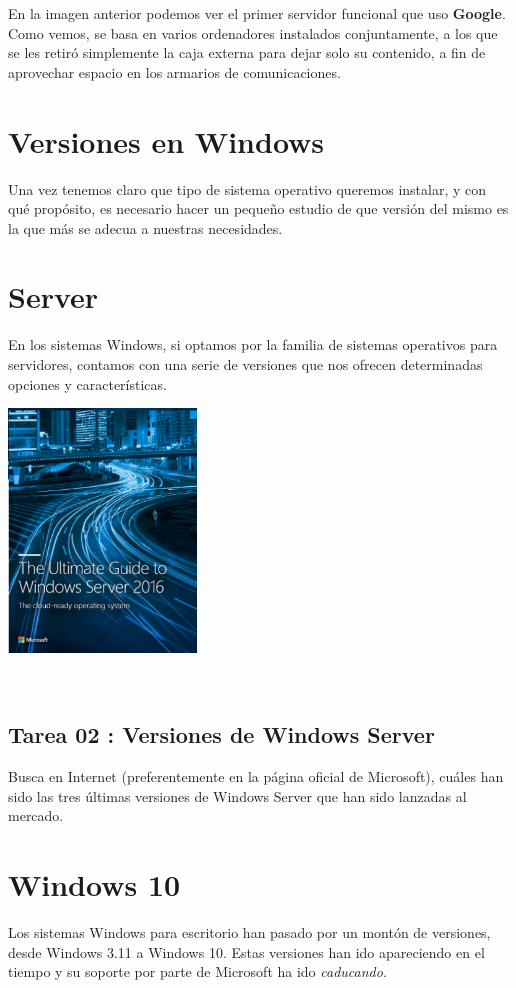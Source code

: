 \documentclass[11pt]{article}
\begin{document}
En la imagen anterior podemos ver el primer servidor funcional que uso
\textbf{Google}. Como vemos, se basa en varios ordenadores instalados
conjuntamente, a los que se les retiró simplemente la caja externa para
dejar solo su contenido, a fin de aprovechar espacio en los armarios de
comunicaciones.


\section{Versiones en Windows}
\label{sec:org2eaf1b4}
Una vez tenemos claro que tipo de sistema operativo queremos instalar, y
con qué propósito, es necesario hacer un pequeño estudio de que versión
del mismo es la que más se adecua a nuestras necesidades.

\section{Server}
\label{sec:org4826bea}
En los sistemas Windows, si optamos por la familia de sistemas
operativos para servidores, contamos con una serie de versiones que nos
ofrecen determinadas opciones y características.

\begin{center}
\includegraphics[width=5cm]{Versiones/WindowsServer_cover.png}
\end{center}  


\subsection{Tarea 02 : Versiones de Windows Server}
\label{sec:org28cdb1f}

Busca en Internet (preferentemente en la página oficial de Microsoft), cuáles han 
sido las tres últimas versiones de Windows Server que han sido lanzadas al mercado.

\section{Windows 10}
\label{sec:orgd00d620}
Los sistemas Windows para escritorio han pasado por un montón de
versiones, desde Windows 3.11 a Windows 10. Estas versiones han ido
apareciendo en el tiempo y su soporte por parte de Microsoft ha ido
\emph{caducando}.
\end{document}
